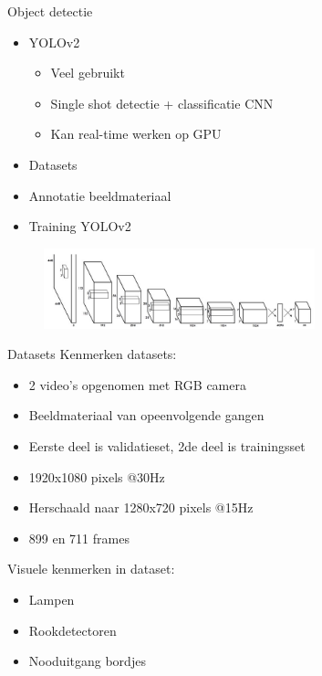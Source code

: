 \documentclass[11pt,t]{beamer}
\begin{document}
\begin{frame}[fragile]{Object detectie}
	\begin{itemize}
		\item YOLOv2
		\begin{itemize}
			\item Veel gebruikt
			\item Single shot detectie + classificatie CNN
			\item Kan real-time werken op GPU
		\end{itemize}

		\item Datasets
		\item Annotatie beeldmateriaal
		\item Training YOLOv2
	\end{itemize}
	\begin{figure}
		\centering
		\includegraphics[width=0.7\textwidth]{graphics/yolo_cnn.jpeg}
	\end{figure}
\end{frame}

\begin{frame}[fragile]{Datasets}
	Kenmerken datasets:
	\begin{itemize}
		\item 2 video's opgenomen met RGB camera
		\item Beeldmateriaal van opeenvolgende gangen
		\item Eerste deel is validatieset, 2de deel is trainingsset
		\item 1920x1080 pixels @30Hz
		\item Herschaald naar 1280x720 pixels @15Hz
		\item 899 en 711 frames
	\end{itemize}

	Visuele kenmerken in dataset:
	\begin{itemize}
		\item Lampen
		\item Rookdetectoren
		\item Nooduitgang bordjes
	\end{itemize}
\end{frame}
\end{document}
